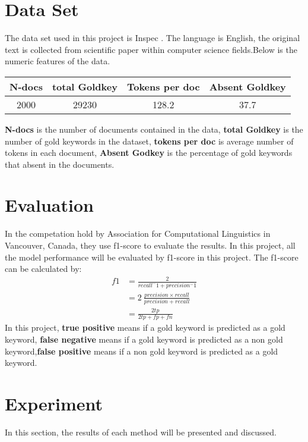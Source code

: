 \documentclass[11pt,a4paper]{article}
\begin{document}
\section{Data Set}
The data set used in this project is Inspec \cite{inspec}. The language is English, the original text is collected from scientific paper within computer
science fields.Below is the numeric features of the data.

\begin{center}
\begin{tabular}{cccc}
    \hline
    N-docs& total Goldkey& Tokens per doc& Absent Goldkey\\
    \hline
    2000&29230& 128.2& 37.7\\
    
    \hline
    \end{tabular}
\end{center}
\noindent
\textbf{N-docs} is the number of documents contained in the data, \textbf{total Goldkey} is the number
of gold keywords in the dataset, \textbf{tokens per doc} is average number of tokens in each document,
\textbf{Absent Godkey} is the percentage of gold keywords that absent in the documents.


\section{Evaluation}
In the competation \cite{augenstein-etal-2017-semeval}hold by Association for Computational Linguistics in Vancouver, Canada,
they use f1-score to evaluate the results. In this project, all the model performance will be evaluated by f1-score in this project.
The f1-score can be calculated by:
$$
\begin{aligned}
f1 &= \frac{2}{recall^-1+precision^-1} \\
&= 2\ \frac{precision \times recall}{precision+recall} \\
&= \frac{2tp}{2tp+fp+fn}
\end{aligned}
$$
In this project, \textbf{true positive} means if a gold keyword is predicted as a gold keyword,
\textbf{false negative} means if a gold keyword is predicted as a non gold keyword,\textbf{false positive}
means if a non gold keyword is predicted as a gold keyword.
\section{Experiment}
In this section, the results of each method will be presented and discussed.
\end{document}
